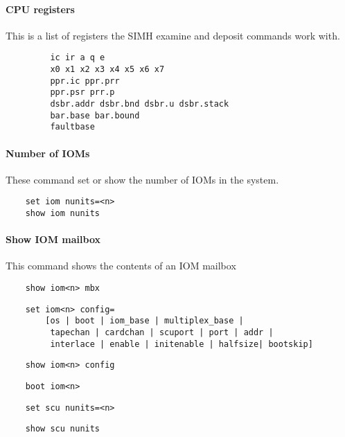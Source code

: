 \documentclass[notitlepage]{report}
\begin{document}
\paragraph{CPU registers}
This is a list of registers the SIMH examine and deposit commands work with.

\begin{lstlisting}
	     ic ir a q e 
	     x0 x1 x2 x3 x4 x5 x6 x7
	     ppr.ic ppr.prr
	     ppr.psr prr.p
	     dsbr.addr dsbr.bnd dsbr.u dsbr.stack
	     bar.base bar.bound
	     faultbase
\end{lstlisting}

\paragraph{Number of IOMs}
These command set or show the number of IOMs in the system.

\begin{lstlisting}
	set iom nunits=<n>
	show iom nunits
\end{lstlisting}

\paragraph{Show IOM mailbox}
This command shows the contents of an IOM mailbox

\begin{lstlisting}
	show iom<n> mbx
\end{lstlisting}

\begin{lstlisting}
	set iom<n> config=
	    [os | boot | iom_base | multiplex_base |
	     tapechan | cardchan | scuport | port | addr |
	     interlace | enable | initenable | halfsize| bootskip]
\end{lstlisting}

\begin{lstlisting}
	show iom<n> config
\end{lstlisting}

\begin{lstlisting}
	boot iom<n>
\end{lstlisting}

\begin{lstlisting}
	set scu nunits=<n>
\end{lstlisting}

\begin{lstlisting}
	show scu nunits
\end{lstlisting}
\end{document}

